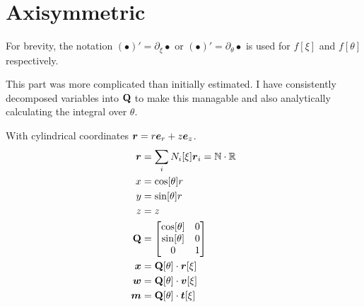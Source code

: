 \documentclass[a4paper,11pt]{article}
\newcommand{\ta}[1]{\text{\boldmath $#1$}} %
\newcommand{\ts}[1]{\text{\boldmath $\mathrm{#1}$}} %
\newcommand{\uv}[1]{\mathbb{#1}}
\newcommand{\um}[1]{\mathbb{#1}}
\newcommand{\pderiv}[2]{\partial_{#2} #1}
\begin{document}
\section{Axisymmetric}
For brevity, the notation $(\bullet)' = \pderiv{\bullet}{\xi}$ or $(\bullet)' = \pderiv{\bullet}{\theta}$ is used for $f[\xi]$ and $f[\theta]$ respectively.

This part was more complicated than initially estimated.
I have consistently decomposed variables into $\ts Q$ to make this managable and also analytically calculating the integral over $\theta$.

With cylindrical coordinates $\ta r = r\ta e_r + z \ta e_z$.
\begin{align}
 \ta r &= \sum_i N_i[\xi]\ta r_i = \um N\cdot \uv R\\
 x &= \cos[\theta] r\\
 y &= \sin[\theta] r\\
 z &= z\\
 \ts Q &= \begin{bmatrix}\cos[\theta] & 0\\ \sin[\theta] & 0\\ 0 & 1\end{bmatrix}\\
 \ta x &= \ts Q[\theta] \cdot \ta r[\xi]\\
 \ta w &= \ts Q[\theta] \cdot \ta v[\xi]\\
 \ta m &= \ts Q[\theta] \cdot \ta t[\xi]
\end{align}
\end{document}
